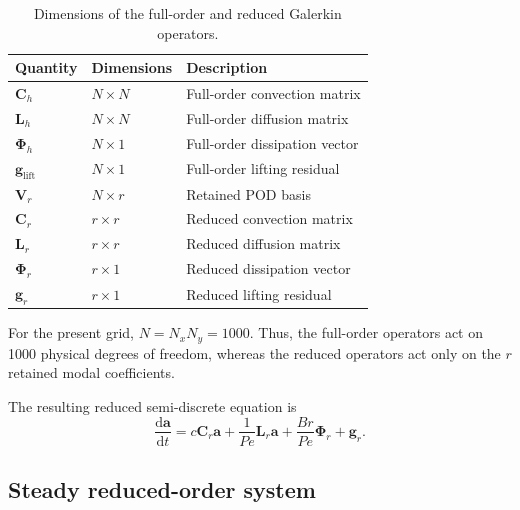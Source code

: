 \begin{table}[htbp]
    \centering
    \caption{Dimensions of the full-order and reduced
    Galerkin operators.}
    \label{tab:galerkin_dimensions}
    \begin{tabular}{lll}
        \toprule
        \textbf{Quantity} &
        \textbf{Dimensions} &
        \textbf{Description} \\
        \midrule
        $\mathbf{C}_h$ &
        $N\times N$ &
        Full-order convection matrix \\
        $\mathbf{L}_h$ &
        $N\times N$ &
        Full-order diffusion matrix \\
        $\boldsymbol{\Phi}_h$ &
        $N\times 1$ &
        Full-order dissipation vector \\
        $\mathbf{g}_{\mathrm{lift}}$ &
        $N\times 1$ &
        Full-order lifting residual \\
        $\mathbf{V}_r$ &
        $N\times r$ &
        Retained POD basis \\
        $\mathbf{C}_r$ &
        $r\times r$ &
        Reduced convection matrix \\
        $\mathbf{L}_r$ &
        $r\times r$ &
        Reduced diffusion matrix \\
        $\boldsymbol{\Phi}_r$ &
        $r\times 1$ &
        Reduced dissipation vector \\
        $\mathbf{g}_r$ &
        $r\times 1$ &
        Reduced lifting residual \\
        \bottomrule
    \end{tabular}
\end{table}

For the present grid, $N=N_xN_y=1000$. Thus, the
full-order operators act on 1000 physical degrees of
freedom, whereas the reduced operators act only on the
$r$ retained modal coefficients.

The resulting reduced semi-discrete equation is
\begin{equation}
    \boxed{
    \frac{\mathrm{d}\mathbf{a}}{\mathrm{d}t}
    =
    c\mathbf{C}_r\mathbf{a}
    +\frac{1}{Pe}\mathbf{L}_r\mathbf{a}
    +\frac{Br}{Pe}\boldsymbol{\Phi}_r
    +\mathbf{g}_r.
    }
    \label{eq:reduced_transient_equation}
\end{equation}

\subsection{Steady reduced-order system}

